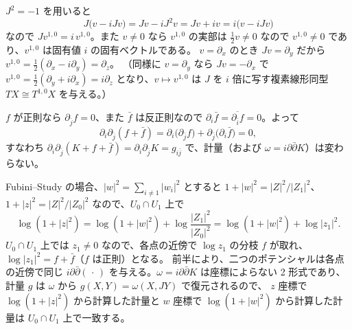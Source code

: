 $J^2 = -1$ を用いると
\[
J\big(v - iJv\big) = Jv - iJ^2v = Jv + iv = i\big(v - iJv\big)
\]
なので $J v^{1,0} = i\,v^{1,0}$。また $v\neq0$ なら $v^{1,0}$ の実部は $\frac12v\neq0$ なので $v^{1,0}\neq0$ であり、$v^{1,0}$ は固有値 $i$ の固有ベクトルである。
$v = \partial_x$ のとき $Jv = \partial_y$ だから $v^{1,0} = \frac12(\partial_x - i\partial_y) = \partial_z$。
（同様に $v = \partial_y$ なら $Jv = -\partial_x$ で $v^{1,0} = \frac12(\partial_y + i\partial_x) = i\partial_z$ となり、$v\mapsto v^{1,0}$ は $J$ を $i$ 倍に写す複素線形同型 $TX\cong T^{1,0}X$ を与える。）

$f$ が正則なら $\partial_{\bar j}f = 0$、また $\bar f$ は反正則なので $\partial_i\bar f = \overline{\partial_{\bar i}f} = 0$。よって
\[
\partial_i\partial_{\bar j}(f+\bar f) = \partial_i\big(\partial_{\bar j}f\big) + \partial_{\bar j}\big(\partial_i\bar f\big) = 0,
\]
すなわち $\partial_i\partial_{\bar j}(K+f+\bar f) = \partial_i\partial_{\bar j}K = g_{i\bar j}$ で、計量（および $\omega = i\partial\bar\partial K$）は変わらない。

Fubini--Study の場合、$|w|^2 = \sum_{i\neq1}|w_i|^2$ とすると $1+|w|^2 = |Z|^2/|Z_1|^2$、$1+|z|^2 = |Z|^2/|Z_0|^2$ なので、$U_0\cap U_1$ 上で
\[
\log(1+|z|^2) = \log(1+|w|^2) + \log\frac{|Z_1|^2}{|Z_0|^2} = \log(1+|w|^2) + \log|z_1|^2 .
\]
$U_0\cap U_1$ 上では $z_1\neq0$ なので、各点の近傍で $\log z_1$ の分枝 $f$ が取れ、$\log|z_1|^2 = f+\bar f$（$f$ は正則）となる。
前半により、二つのポテンシャルは各点の近傍で同じ $i\partial\bar\partial(\,\cdot\,)$ を与える。$\omega = i\partial\bar\partial K$ は座標によらない 2 形式であり、計量 $g$ は $\omega$ から $g(X,Y) = \omega(X,JY)$ で復元されるので、
$z$ 座標で $\log(1+|z|^2)$ から計算した計量と $w$ 座標で $\log(1+|w|^2)$ から計算した計量は $U_0\cap U_1$ 上で一致する。

